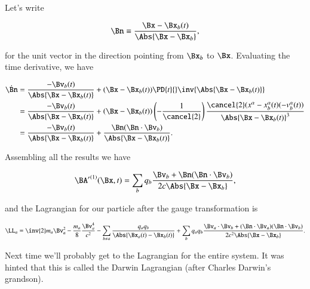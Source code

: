 Let's write

\begin{equation}\label{eqn:relativisticElectrodynamicsL25:430}
\Bn \equiv \frac{\Bx - \Bx_b(t)}{\Abs{\Bx - \Bx_b}},
\end{equation}

for the unit vector in the direction pointing from $\Bx_b$ to $\Bx$.  Evaluating the time derivative, we have

\begin{align*}
\dot{\Bn} 
&= 
\frac{- \Bv_b(t)}{\Abs{\Bx -\Bx_b(t)}}
+(\Bx - \Bx_b(t)) \PD{t}{} \inv{\Abs{\Bx -\Bx_b(t)}} \\
&= 
\frac{- \Bv_b(t)}{\Abs{\Bx -\Bx_b(t)}}
+(\Bx - \Bx_b(t)) 
\left(
-\frac{1}{\cancel{2}} 
\right) \frac{ \cancel{2} (x^\alpha - x^\alpha_b(t) (-v^\alpha_b(t))}{\Abs{\Bx - \Bx_b(t)}^3} \\
&= 
\frac{- \Bv_b(t)}{\Abs{\Bx -\Bx_b(t)}}
+ \frac{\Bn (\Bn \cdot \Bv_b)}{\Abs{\Bx - \Bx_b(t)}}.
\end{align*}

Assembling all the results we have

\begin{equation}\label{eqn:relativisticElectrodynamicsL25:450}
{\BA'}^{(1)}(\Bx, t) = \sum_b q_b \frac{\Bv_b + \Bn (\Bn \cdot \Bv_b)}{2 c \Abs{\Bx - \Bx_b} },
\end{equation}

and the Lagrangian for our particle after the gauge transformation is

\begin{equation}\label{eqn:relativisticElectrodynamicsL25:330b}
\LL_a = \inv{2} m_a \Bv_a^2 - \frac{m_a}{8} \frac{\Bv_a^4}{c^2} 
-\sum_{b \ne a} \frac{q_a q_b}{\Abs{\Bx_a(t) - \Bx_b(t)}}
+\sum_b q_a q_b \frac{\Bv_a \cdot \Bv_b + (\Bn \cdot \Bv_a) (\Bn \cdot \Bv_b)}{2 c^2 \Abs{\Bx - \Bx_b} }.
\end{equation}

Next time we'll probably get to the Lagrangian for the entire system.  It was hinted that this is called the Darwin Lagrangian (after Charles Darwin's grandson).

\EndArticle
